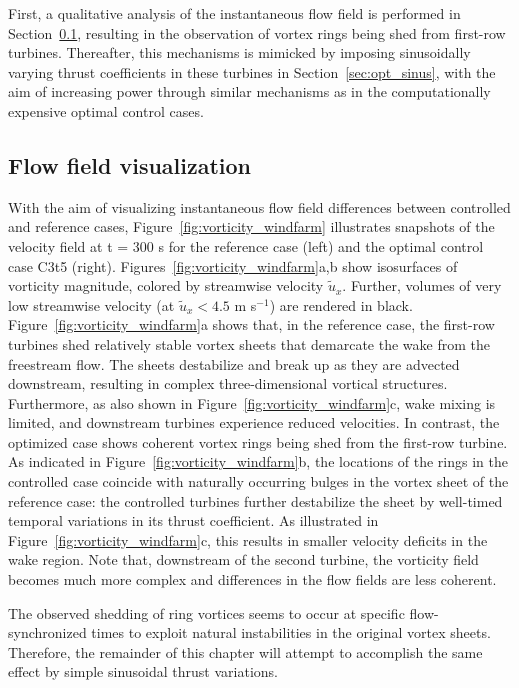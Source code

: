 First, a qualitative analysis of the instantaneous flow field is performed in Section~\ref{sec:opt_visualization}, resulting in the observation of vortex rings being shed from first-row turbines. Thereafter, this mechanisms is mimicked by imposing sinusoidally varying thrust coefficients in these turbines in Section~\ref{sec:opt_sinus}, with the aim of increasing power through similar mechanisms as in the computationally expensive optimal control cases.

\subsection{Flow field visualization}\label{sec:opt_visualization}
With the aim of visualizing instantaneous flow field differences between controlled and reference cases, Figure~\ref{fig:vorticity_windfarm} illustrates snapshots of the velocity field at t = 300 s for the reference case (left) and the optimal control case C3t5 (right). Figures~\ref{fig:vorticity_windfarm}a,b show isosurfaces of vorticity magnitude, colored by streamwise velocity $\widetilde{u}_x$. Further, volumes of very low streamwise velocity (at $\widetilde{u}_x < 4.5 $ m s$^{-1}$) are rendered in black. Figure~\ref{fig:vorticity_windfarm}a shows that, in the reference case, the first-row turbines shed relatively stable vortex sheets that demarcate the wake from the freestream flow. The sheets destabilize and break up as they are advected downstream, resulting in complex three-dimensional vortical structures. Furthermore, as also shown in Figure~\ref{fig:vorticity_windfarm}c, wake mixing is limited, and downstream turbines experience reduced velocities. In contrast, the optimized case shows coherent vortex rings being shed from the first-row turbine. As indicated in Figure~\ref{fig:vorticity_windfarm}b, the locations of the rings in the controlled case coincide with naturally occurring bulges in the vortex sheet of the reference case: the controlled turbines further destabilize the sheet by well-timed temporal variations in its thrust coefficient. As illustrated in Figure~\ref{fig:vorticity_windfarm}c, this results in smaller velocity deficits in the wake region. Note that, downstream of the second turbine, the vorticity field becomes much more complex and differences in the flow fields are less coherent. 

The observed shedding of ring vortices seems to occur at specific flow-synchronized times to exploit natural instabilities in the original vortex sheets. Therefore, the remainder of this chapter will attempt to accomplish the same effect by simple sinusoidal thrust variations. 

